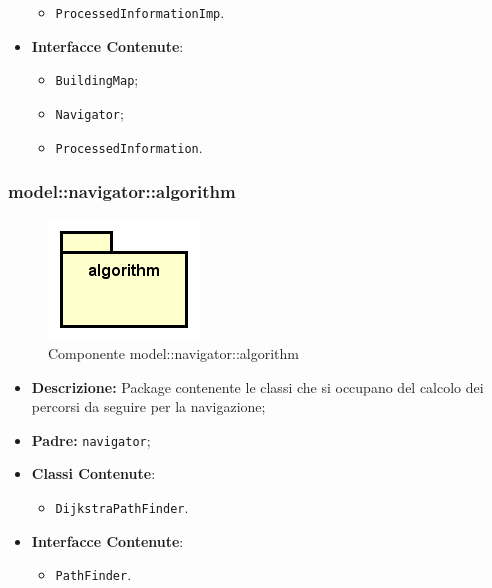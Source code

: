 \documentclass[../DefinizioneDiProdotto.tex]{subfiles}
\begin{document}
\begin{itemize}
\begin{itemize}
		\item \texttt{ProcessedInformationImp}.
		
	\end{itemize}
	\item \textbf{Interfacce Contenute}:
	\begin{itemize}
		\item \texttt{BuildingMap};
		
		\item \texttt{Navigator};
		
		\item \texttt{ProcessedInformation}.
		
	\end{itemize}
\end{itemize}

\subsubsection{model::\-navigator::\-algorithm}

\begin{figure}[H]
	\centering
	\includegraphics[width=\maxwidth]{img/package/algorithm.png}
	\caption{Componente model::\-navigator::\-algorithm}\label{fig:model::navigator::algorithm} 
\end{figure}
\begin{itemize}
	\item \textbf{Descrizione:} Package contenente le classi che si occupano del calcolo dei percorsi da seguire per la navigazione;
	\item \textbf{Padre:} \texttt{navigator};
	\item \textbf{Classi Contenute}:
	\begin{itemize}
		\item \texttt{DijkstraPathFinder}.
		
	\end{itemize}
	\item \textbf{Interfacce Contenute}:
	\begin{itemize}
		\item \texttt{PathFinder}.
		
	\end{itemize}
\end{itemize}
\end{document}
